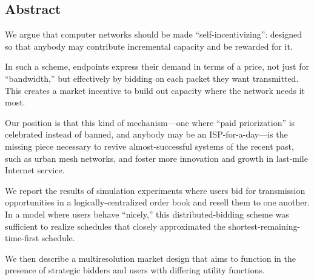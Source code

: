 \subsection*{Abstract}
We argue that computer networks should be made ``self-incentivizing'':
designed so that anybody may contribute incremental capacity and be
rewarded for it.

In such a scheme, endpoints express their demand in terms of a price,
not just for ``bandwidth,'' but effectively by bidding on each packet
they want transmitted. This creates a market incentive to build out
capacity where the network needs it most.

Our position is that this kind of mechanism---one where ``paid
priorization'' is celebrated instead of banned, and anybody may be an
ISP-for-a-day---is the missing piece necessary to revive
almost-successful systems of the recent past, such as urban mesh
networks, and foster more innovation and growth in last-mile Internet service.

We report the results of simulation experiments where users bid for
transmission opportunities in a logically-centralized order book and
resell them to one another. In a model where users behave ``nicely,''
this distributed-bidding scheme was sufficient to realize schedules
that closely approximated the shortest-remaining-time-first schedule.

We then describe a multiresolution market design that aims to function
in the presence of strategic bidders and users with differing utility functions.

